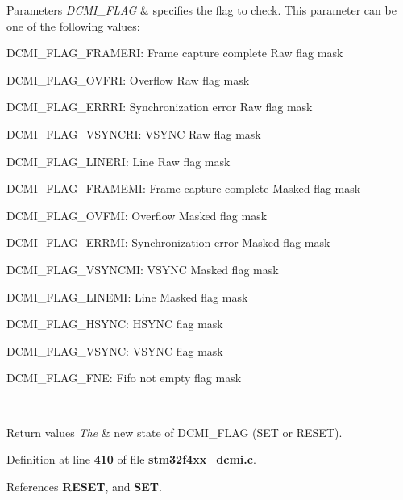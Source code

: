 \begin{DoxyParams}{Parameters}
{\em D\+C\+M\+I\+\_\+\+F\+L\+AG} & specifies the flag to check. This parameter can be one of the following values\+: \begin{DoxyItemize}
\item D\+C\+M\+I\+\_\+\+F\+L\+A\+G\+\_\+\+F\+R\+A\+M\+E\+RI\+: Frame capture complete Raw flag mask \item D\+C\+M\+I\+\_\+\+F\+L\+A\+G\+\_\+\+O\+V\+F\+RI\+: Overflow Raw flag mask \item D\+C\+M\+I\+\_\+\+F\+L\+A\+G\+\_\+\+E\+R\+R\+RI\+: Synchronization error Raw flag mask \item D\+C\+M\+I\+\_\+\+F\+L\+A\+G\+\_\+\+V\+S\+Y\+N\+C\+RI\+: V\+S\+Y\+NC Raw flag mask \item D\+C\+M\+I\+\_\+\+F\+L\+A\+G\+\_\+\+L\+I\+N\+E\+RI\+: Line Raw flag mask \item D\+C\+M\+I\+\_\+\+F\+L\+A\+G\+\_\+\+F\+R\+A\+M\+E\+MI\+: Frame capture complete Masked flag mask \item D\+C\+M\+I\+\_\+\+F\+L\+A\+G\+\_\+\+O\+V\+F\+MI\+: Overflow Masked flag mask \item D\+C\+M\+I\+\_\+\+F\+L\+A\+G\+\_\+\+E\+R\+R\+MI\+: Synchronization error Masked flag mask \item D\+C\+M\+I\+\_\+\+F\+L\+A\+G\+\_\+\+V\+S\+Y\+N\+C\+MI\+: V\+S\+Y\+NC Masked flag mask \item D\+C\+M\+I\+\_\+\+F\+L\+A\+G\+\_\+\+L\+I\+N\+E\+MI\+: Line Masked flag mask \item D\+C\+M\+I\+\_\+\+F\+L\+A\+G\+\_\+\+H\+S\+Y\+NC\+: H\+S\+Y\+NC flag mask \item D\+C\+M\+I\+\_\+\+F\+L\+A\+G\+\_\+\+V\+S\+Y\+NC\+: V\+S\+Y\+NC flag mask \item D\+C\+M\+I\+\_\+\+F\+L\+A\+G\+\_\+\+F\+NE\+: Fifo not empty flag mask \end{DoxyItemize}
\\
\hline
\end{DoxyParams}

\begin{DoxyRetVals}{Return values}
{\em The} & new state of D\+C\+M\+I\+\_\+\+F\+L\+AG (S\+ET or R\+E\+S\+ET). \\
\hline
\end{DoxyRetVals}


Definition at line \textbf{ 410} of file \textbf{ stm32f4xx\+\_\+dcmi.\+c}.



References \textbf{ R\+E\+S\+ET}, and \textbf{ S\+ET}.


